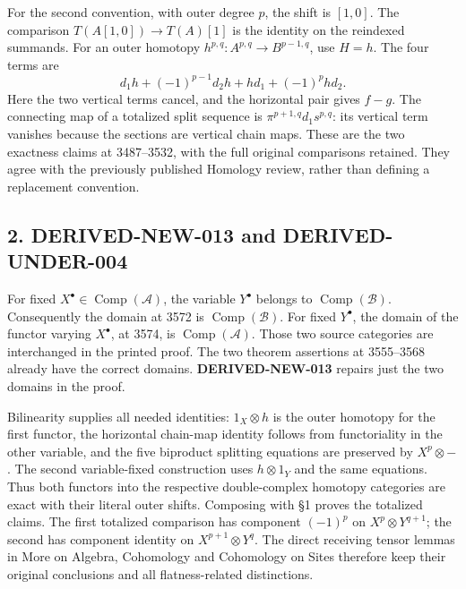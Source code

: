 \documentclass[11pt]{article}
\begin{document}
For the second convention,\allowbreak{} with outer degree \(p\),\allowbreak{} the shift is \([1,0]\). The comparison \(T(A[1,0])\to T(A)[1]\) is the identity on the reindexed summands. For an outer homotopy \(h^{p,q}:A^{p,q}\to B^{p-1,q}\),\allowbreak{} use \(H=h\). The four terms are \[
d_1h+(-1)^{p-1}d_2h+hd_1+(-1)^phd_2.
\] Here the two vertical terms cancel,\allowbreak{} and the horizontal pair gives \(f-g\). The connecting map of a totalized split sequence is \(\pi^{p+1,q}d_1s^{p,q}\):\allowbreak{} its vertical term vanishes because the sections are vertical chain maps. These are the two exactness claims at 3487–\allowbreak{}3532,\allowbreak{} with the full original comparisons retained. They agree with the previously published Homology review,\allowbreak{} rather than defining a replacement convention.

\subsection{2. DERIVED-NEW-013 and DERIVED-UNDER-004}\label{proofs-3487-4161-derived-new-013-and-derived-under-004}

For fixed \(X^\bullet\in\operatorname{Comp}(\mathcal A)\),\allowbreak{} the variable \(Y^\bullet\) belongs to \(\operatorname{Comp}(\mathcal B)\). Consequently the domain at 3572 is \(\operatorname{Comp}(\mathcal B)\). For fixed \(Y^\bullet\),\allowbreak{} the domain of the functor varying \(X^\bullet\),\allowbreak{} at 3574,\allowbreak{} is \(\operatorname{Comp}(\mathcal A)\). Those two source categories are interchanged in the printed proof. The two theorem assertions at 3555–\allowbreak{}3568 already have the correct domains. \textbf{DERIVED-NEW-013} repairs just the two domains in the proof.

Bilinearity supplies all needed identities:\allowbreak{} \(1_X\otimes h\) is the outer homotopy for the first functor,\allowbreak{} the horizontal chain-map identity follows from functoriality in the other variable,\allowbreak{} and the five biproduct splitting equations are preserved by \(X^p\otimes-\). The second variable-fixed construction uses \(h\otimes1_Y\) and the same equations. Thus both functors into the respective double-complex homotopy categories are exact with their literal outer shifts. Composing with §1 proves the totalized claims. The first totalized comparison has component \((-1)^p\) on \(X^p\otimes Y^{q+1}\); the second has component identity on \(X^{p+1}\otimes Y^q\). The direct receiving tensor lemmas in More on Algebra,\allowbreak{} Cohomology and Cohomology on Sites therefore keep their original conclusions and all flatness-related distinctions.
\end{document}
